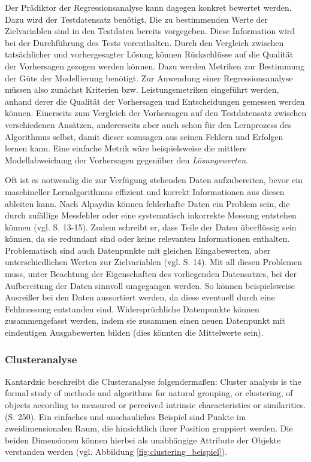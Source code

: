 \documentclass[
	twoside,
	12pt,
	a4paper,
	BCOR10mm,
	DIV14,
	listof=totoc,
	bibliography=totoc,
	headsepline
]{scrreprt}
\begin{document}
Der Prädiktor der Regressionsanalyse kann dagegen konkret bewertet werden. Dazu wird der Testdatensatz benötigt. Die zu bestimmenden Werte der Zielvariablen sind in den Testdaten bereits vorgegeben.
Diese Information wird bei der Durchführung des Tests vorenthalten. Durch den Vergleich zwischen tatsächlicher und vorhergesagter Lösung können Rückschlüsse auf die Qualität der Vorhersagen gezogen werden können. Dazu werden Metriken zur Bestimmung der Güte der Modellierung benötigt.
Zur Anwendung einer Regressionsanalyse müssen also zunächst Kriterien bzw. Leistungsmetriken eingeführt werden, anhand derer die Qualität der Vorhersagen und Entscheidungen gemessen werden können. Einerseits zum Vergleich der Vorhersagen auf den Testdatensatz zwischen verschiedenen Ansätzen, andererseits aber auch schon für den Lernprozess des Algorithmus selbst, damit dieser sozusagen aus seinen Fehlern und Erfolgen lernen kann. Eine einfache Metrik wäre beispielsweise die mittlere Modellabweichung der Vorhersagen gegenüber den \textit{Lösungswerten}.
\medskip

Oft ist es notwendig die zur Verfügung stehenden Daten aufzubereiten, bevor ein maschineller Lernalgorithmus effizient und korrekt Informationen aus diesen ableiten kann.
Nach Alpaydin können fehlerhafte Daten ein Problem sein, die durch zufällige Messfehler oder eine systematisch inkorrekte Messung entstehen können (vgl. \cite{Alpaydin:2010:IML:1734076} S. 13-15). Zudem schreibt er, dass Teile der Daten überflüssig sein können, da sie redundant sind oder keine relevanten Informationen enthalten. Problematisch sind auch Datenpunkte mit gleichen Eingabewerten, aber unterschiedlichen Werten zur Zielvariablen (vgl. \cite{Alpaydin:2010:IML:1734076} S. 14).
Mit all diesen Problemen muss, unter Beachtung der Eigenschaften des vorliegenden Datensatzes, bei der Aufbereitung der Daten sinnvoll umgegangen werden. So können beispielsweise Ausreißer bei den Daten aussortiert werden, da diese eventuell durch eine Fehlmessung entstanden sind. Widersprüchliche Datenpunkte können zusammengefasst werden, indem sie zusammen einen neuen Datenpunkt mit eindeutigen Ausgabewerten bilden (dies könnten die Mittelwerte sein).

\subsubsection{Clusteranalyse}
Kantardzic beschreibt die Clusteranalyse folgendermaßen: \glqq Cluster analysis is the formal study of methods and algorithms for natural grouping, or clustering, of objects according to measured or perceived intrinsic characteristics or similarities.\grqq{} \cite{kantardzic2011data} (S. 250). Ein einfaches und anschauliches Beispiel sind Punkte im zweidimensionalen Raum, die hinsichtlich ihrer Position gruppiert werden. Die beiden Dimensionen können hierbei als unabhängige Attribute der Objekte verstanden werden (vgl. Abbildung \ref{fig:clustering_beispiel}).
\end{document}
